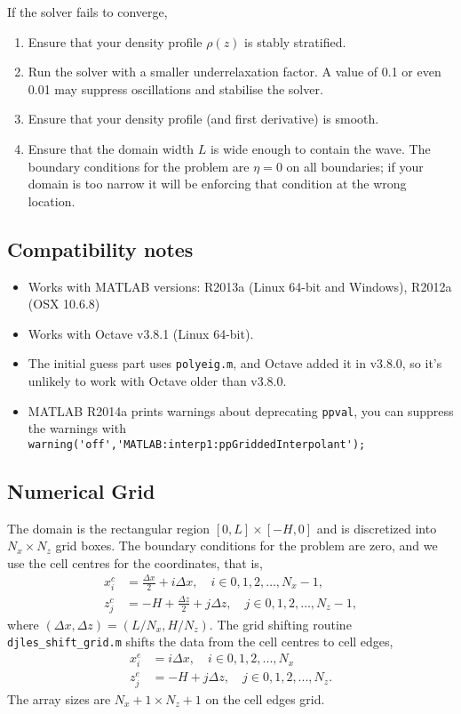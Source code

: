 \documentclass[letterpaper]{article}
\begin{document}
If the solver fails to converge, 
\begin{enumerate}
 \item Ensure that your density profile $\rho(z)$ is stably stratified.
 \item Run the solver with a smaller underrelaxation factor. A value of 0.1 or even 0.01 may suppress oscillations and stabilise the solver. 
 \item Ensure that your density profile (and first derivative) is smooth.
 \item Ensure that the domain width $L$ is wide enough to contain the wave. The boundary conditions for the problem are $\eta=0$ on all boundaries; if your domain is too narrow it will be enforcing that condition at the wrong location.
\end{enumerate}

\subsection{Compatibility notes}
\begin{itemize}
 \item Works with MATLAB versions: R2013a (Linux 64-bit and Windows), R2012a (OSX 10.6.8)
 \item Works with Octave v3.8.1 (Linux 64-bit).
 \item The initial guess part uses \verb+polyeig.m+, and Octave added it in v3.8.0, so it's unlikely to work with Octave older than v3.8.0.
 \item MATLAB R2014a prints warnings about deprecating \verb+ppval+, you can suppress the warnings with \\ \verb+warning('off','MATLAB:interp1:ppGriddedInterpolant');+
\end{itemize}

\subsection{Numerical Grid}
The domain is the rectangular region $[0,L] \times [-H,0]$ and is discretized into $N_x\times N_z$ grid boxes. The boundary conditions for the problem are zero, and we use the cell centres for the coordinates, that is,
\begin{align}
x_i^c &= \frac{\Delta x}{2}  + i \Delta x, \quad i \in 0,1,2,\hdots,N_x-1,\\
z_j^c &= -H + \frac{\Delta z}{2}  + j \Delta z, \quad j  \in 0,1,2,\hdots,N_z-1,
\end{align}
where $(\Delta x, \Delta z) = (L/N_x, H/N_z)$. The grid shifting routine \verb+djles_shift_grid.m+ shifts the data from the cell centres to cell edges, 
\begin{align}
x_i^e &= i \Delta x, \quad i \in 0,1,2,...,N_x\\
z_j^e &= -H + j \Delta z, \quad j  \in 0,1,2,...,N_z.
\end{align}
The array sizes are $N_x+1 \times N_z+1$ on the cell edges grid.
\end{document}
